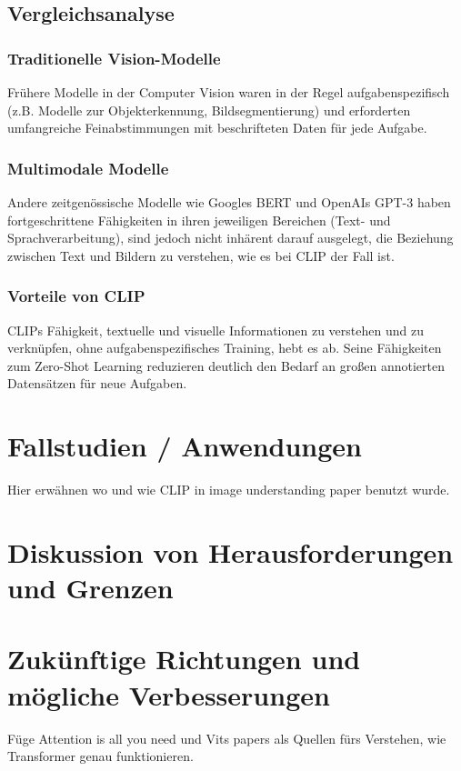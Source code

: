 \documentclass[nolibertine, ngerman, algorithm, nomencl, minted]{ttlab-qualify}
\begin{document}
\subsection{Vergleichsanalyse}

\subsubsection{Traditionelle Vision-Modelle}
Frühere Modelle in der Computer Vision waren in der Regel aufgabenspezifisch (z.B. Modelle zur Objekterkennung, Bildsegmentierung) und erforderten umfangreiche Feinabstimmungen mit beschrifteten Daten für jede Aufgabe.

\subsubsection{Multimodale Modelle}
Andere zeitgenössische Modelle wie Googles BERT und OpenAIs GPT-3 haben fortgeschrittene 
Fähigkeiten in ihren jeweiligen Bereichen (Text- und Sprachverarbeitung), sind jedoch nicht 
inhärent darauf ausgelegt, die Beziehung zwischen Text und Bildern zu verstehen, 
wie es bei CLIP der Fall ist.

\subsubsection{Vorteile von CLIP}
CLIPs Fähigkeit, textuelle und visuelle Informationen zu verstehen und zu verknüpfen, 
ohne aufgabenspezifisches Training, hebt es ab. Seine Fähigkeiten zum Zero-Shot Learning 
reduzieren deutlich den Bedarf an großen annotierten Datensätzen für neue Aufgaben.

\section{Fallstudien / Anwendungen}
\label{sec:Fallstudien-Anwendung}
Hier erwähnen wo und wie CLIP in image understanding paper benutzt wurde.
\section{Diskussion von Herausforderungen und Grenzen}
\section{Zukünftige Richtungen und mögliche Verbesserungen}
Füge Attention is all you need und Vits papers als Quellen fürs Verstehen, wie Transformer genau funktionieren.
\printbibliography
\appendix
\end{document}
